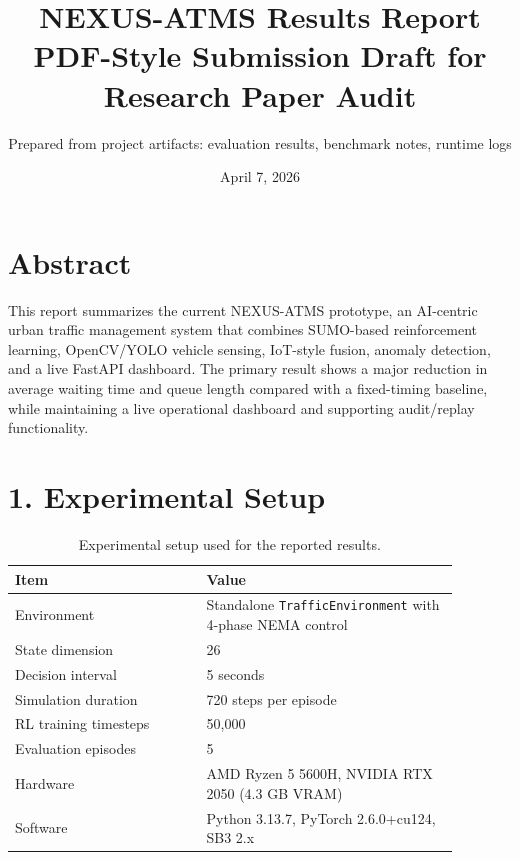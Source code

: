 \documentclass[11pt,a4paper]{article}
\title{\textbf{NEXUS-ATMS Results Report} \\
\large PDF-Style Submission Draft for Research Paper Audit}
\author{Prepared from project artifacts: evaluation results, benchmark notes, runtime logs}
\date{April 7, 2026}
\begin{document}
\maketitle

\section*{Abstract}
This report summarizes the current NEXUS-ATMS prototype, an AI-centric urban traffic management system that combines SUMO-based reinforcement learning, OpenCV/YOLO vehicle sensing, IoT-style fusion, anomaly detection, and a live FastAPI dashboard. The primary result shows a major reduction in average waiting time and queue length compared with a fixed-timing baseline, while maintaining a live operational dashboard and supporting audit/replay functionality.

\section*{1. Experimental Setup}
\begin{table}[h!]
\centering
\caption{Experimental setup used for the reported results.}
\begin{tabular}{p{0.38\linewidth} p{0.50\linewidth}}
\toprule
\textbf{Item} & \textbf{Value} \\
\midrule
Environment & Standalone \texttt{TrafficEnvironment} with 4-phase NEMA control \\
State dimension & 26 \\
Decision interval & 5 seconds \\
Simulation duration & 720 steps per episode \\
RL training timesteps & 50{,}000 \\
Evaluation episodes & 5 \\
Hardware & AMD Ryzen 5 5600H, NVIDIA RTX 2050 (4.3 GB VRAM) \\
Software & Python 3.13.7, PyTorch 2.6.0+cu124, SB3 2.x \\
\bottomrule
\end{tabular}
\end{table}
\end{document}
